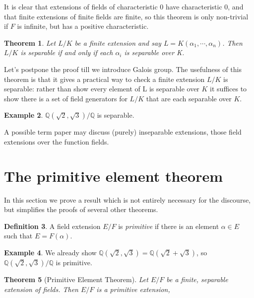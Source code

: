 \documentclass[12pt]{report}
\newtheorem{thm}{Theorem}[section]
\theoremstyle{definition}
\newtheorem{defn}[thm]{Definition}
\newtheorem{example}[thm]{Example}
\def\QQ{\mathbb{Q}}
\def\aa{\alpha}
\begin{document}
It is clear that extensions of fields of characteristic 0 have characteristic 0, and that finite extensions of finite fields are finite, so this theorem is only non-trivial if $F$ is infinite, but has a positive characteristic.

\begin{thm}\label{sep2}
    Let $L/K$ be a finite extension and say $L = K(\aa_1,\cdots,\aa_n)$. Then $L/K$ is separable if and only if each $\aa_i$ is separable over K.
\end{thm}

Let's postpone the proof till we introduce Galois group. The usefulness of this theorem is that it gives a practical way to check a finite extension $L/K$ is separable: rather than show every element of L is separable over $K$ it suffices to show there is a set of field generators for $L/K$ that are each separable over $K$.

\begin{example}
    $\QQ(\sqrt{2},\sqrt{3})/\QQ$ is separable. 
\end{example}

A possible term paper may discuss (purely) inseparable extensions, those field extensions over the function fields.

\section{The primitive element theorem}

In this section we prove a result which is not entirely necessary for the discourse, but simplifies the proofs of several other theorems.

\begin{defn}
    A field extension $E/F$ is \emph{primitive} if there is an element $\aa\in E$ such that $E=F(\aa)$.
\end{defn}

\begin{example}
    We already show $\QQ(\sqrt{2},\sqrt{3})=\QQ(\sqrt{2}+\sqrt{3})$, so $\QQ(\sqrt{2},\sqrt{3})/\QQ$ is primitive.
\end{example}

\begin{thm}[Primitive Element Theorem]\label{primitive}
    Let $E/F$ be a finite, separable extension of fields. Then $E/F$ is a primitive extension,
\end{thm}
\end{document}
